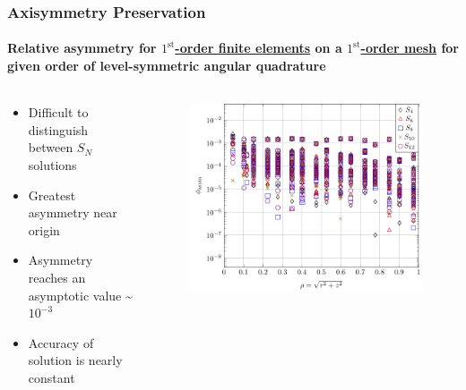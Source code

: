 \documentclass[compress,t]{beamer}
\begin{document}
\begin{frame}[t]
\frametitle{Axisymmetry Preservation}
\framesubtitle{Relative asymmetry for \underline{$1^\text{st}$-order finite elements} on a \underline{$1^\text{st}$-order mesh} for given order of level-symmetric angular quadrature}

\begin{columns}[T]

\begin{column}{0.4\textwidth}
\begin{itemize}
\item{Difficult to distinguish between $S_N$ solutions}
\item{Greatest asymmetry near origin}
\item{Asymmetry reaches an asymptotic value \textasciitilde$10^{-3}$}
\item{Accuracy of solution is nearly constant}
\end{itemize}

\end{column}

\begin{column}{0.6\textwidth}
\begin{figure}
\flushright
\includegraphics[scale=0.6]{./graphics/RZASMMSLinearRhoBrunnerp1g1r2.pdf}
\end{figure}

\end{column}

\end{columns}

\end{frame}
\end{document}

